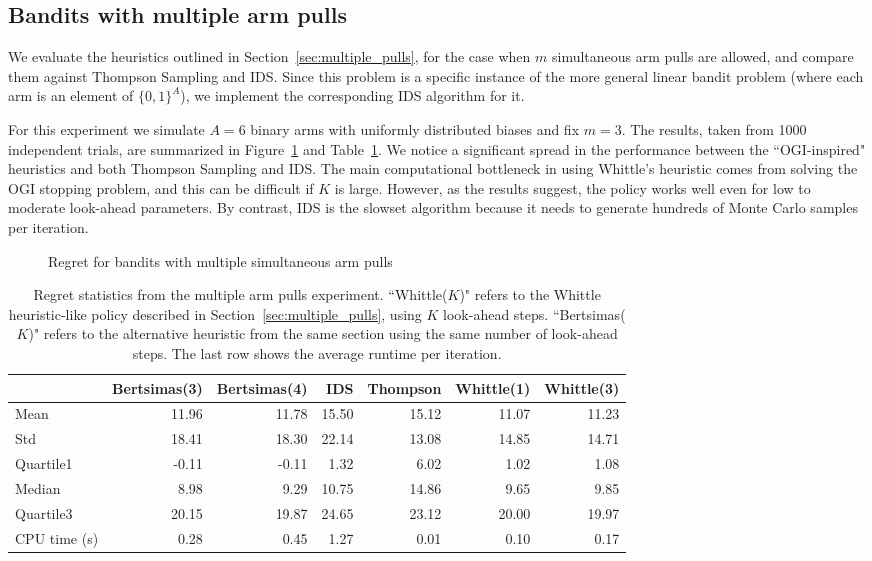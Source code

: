 \subsection{Bandits with multiple arm pulls}
We evaluate the heuristics outlined in Section~\ref{sec:multiple_pulls}, for the case when $m$ simultaneous arm pulls are allowed, and compare them against Thompson Sampling and IDS. Since this problem is a specific instance of the more general linear bandit problem (where each arm is an element of $\{0,1\}^A$), we implement the corresponding IDS algorithm for it.

For this experiment we simulate $A = 6$ binary arms with uniformly distributed biases and fix $m =3$. The results, taken from 1000 independent trials, are summarized in Figure~\ref{fig:restless1} and Table~\ref{table:restless1_summary}. We notice a significant spread in the performance between the ``OGI-inspired" heuristics and both Thompson Sampling and IDS. The main computational bottleneck in using Whittle's heuristic comes from solving the OGI stopping problem, and this can be difficult if $K$ is large. However, as the results suggest, the policy works well even for low to moderate look-ahead parameters. By contrast, IDS is the slowset algorithm because it needs to generate hundreds of Monte Carlo samples per iteration.
\begin{figure}
	\centering
	
	\caption{Regret for bandits with multiple simultaneous arm pulls}
	\label{fig:restless1}
\end{figure}

\begin{table}
	\centering
	\begin{tabular}{lrrrrrr}
		\toprule
		{} &  Bertsimas(3) &  Bertsimas(4) &   IDS &  Thompson &  Whittle(1) &  Whittle(3) \\
		\midrule
		Mean      &         11.96 &         11.78 & 15.50 &     15.12 &       11.07 &       11.23 \\
		Std       &         18.41 &         18.30 & 22.14 &     13.08 &       14.85 &       14.71 \\
		Quartile1 &         -0.11 &         -0.11 &  1.32 &      6.02 &        1.02 &        1.08 \\
		Median    &          8.98 &          9.29 & 10.75 &     14.86 &        9.65 &        9.85 \\
		Quartile3 &         20.15 &         19.87 & 24.65 &     23.12 &       20.00 &       19.97 \\
		CPU time (s)  &          0.28 &          0.45 &  1.27 &      0.01 &        0.10 &        0.17 \\
		\bottomrule
	\end{tabular}
	
	\caption{Regret statistics from the multiple arm pulls experiment. ``Whittle($K$)" refers to the Whittle heuristic-like policy described in Section~\ref{sec:multiple_pulls}, using $K$ look-ahead steps. ``Bertsimas($K$)" refers to the alternative heuristic from the same section using the same number of look-ahead steps. The last row shows the average runtime per iteration.}
	\label{table:restless1_summary}
\end{table}